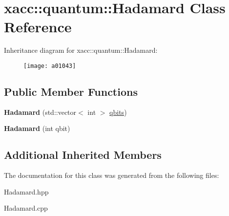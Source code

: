 \hypertarget{a01043}{}\section{xacc\+:\+:quantum\+:\+:Hadamard Class Reference}
\label{a01043}
Inheritance diagram for xacc\+:\+:quantum\+:\+:Hadamard\+:\begin{figure}[H]
\begin{center}
\leavevmode
\texttt{[image: a01043]}
\end{center}
\end{figure}
\subsection*{Public Member Functions}
\begin{DoxyCompactItemize}
\item 
\mbox{\label{a01043_a1f26925eeb4a52ca7e52dd9158fe7005}} 
{\bfseries Hadamard} (std\+::vector$<$ int $>$ \hyperlink{a01015_a2a56be6c2519ea65df4d06f4abae1393}{qbits})
\item 
\mbox{\label{a01043_aac4e06aae35583bcce39b6b178948364}} 
{\bfseries Hadamard} (int qbit)
\end{DoxyCompactItemize}
\subsection*{Additional Inherited Members}


The documentation for this class was generated from the following files\+:\begin{DoxyCompactItemize}
\item 
Hadamard.\+hpp\item 
Hadamard.\+cpp\end{DoxyCompactItemize}
